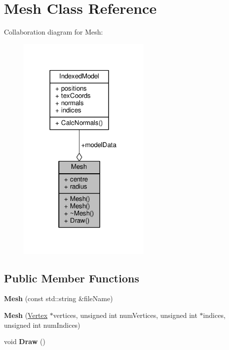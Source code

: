 \hypertarget{class_mesh}{}\section{Mesh Class Reference}
\label{class_mesh}


Collaboration diagram for Mesh\+:\nopagebreak
\begin{figure}[H]
\begin{center}
\leavevmode
\includegraphics[width=182pt]{class_mesh__coll__graph}
\end{center}
\end{figure}
\subsection*{Public Member Functions}
\begin{DoxyCompactItemize}
\item 
{\bfseries Mesh} (const std\+::string \&file\+Name)\hypertarget{class_mesh_a4c4a1abe6f54d0bc2e4d07908fa43f21}{}\label{class_mesh_a4c4a1abe6f54d0bc2e4d07908fa43f21}

\item 
{\bfseries Mesh} (\hyperlink{class_vertex}{Vertex} $\ast$vertices, unsigned int num\+Vertices, unsigned int $\ast$indices, unsigned int num\+Indices)\hypertarget{class_mesh_a2401dd4fde4e5dbce58b5964648051e2}{}\label{class_mesh_a2401dd4fde4e5dbce58b5964648051e2}

\item 
void {\bfseries Draw} ()\hypertarget{class_mesh_afdd95c079fd0442afef8a6c421c8bfc9}{}\label{class_mesh_afdd95c079fd0442afef8a6c421c8bfc9}

\end{DoxyCompactItemize}
